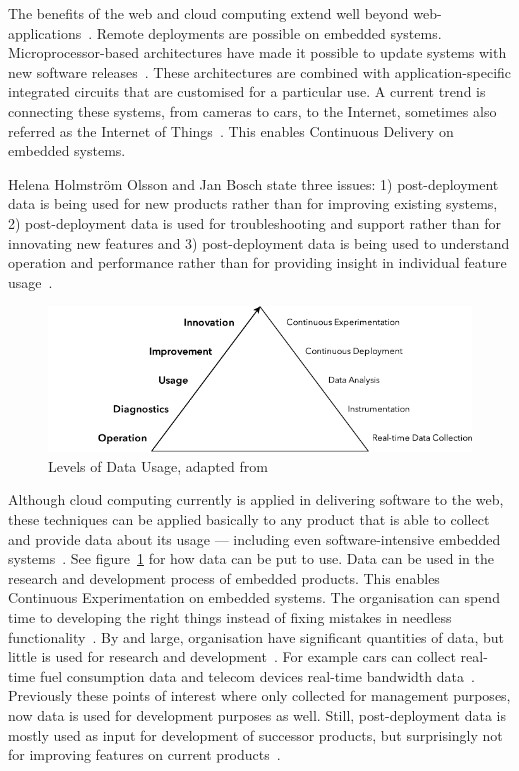 \documentclass[english]{tktltiki2}
\begin{document}
The benefits of the web and cloud computing extend well beyond web-applications~\cite{BE12}. Remote deployments are possible on embedded systems. Microprocessor-based architectures have made it possible to update systems with new software releases~\cite{RA03}. These architectures are combined with application-specific integrated circuits that are customised for a particular use. A current trend is connecting these systems, from cameras to cars, to the Internet, sometimes also referred as the Internet of Things~\cite{BE12, HB14}. This enables Continuous Delivery on embedded systems.

Helena Holmström Olsson and Jan Bosch state three issues: 1) post-deployment data is being used for new products rather than for improving existing systems, 2) post-deployment data is used for troubleshooting and support rather than for innovating new features and 3) post-deployment data is being used to understand operation and performance rather than for providing insight in individual feature usage~\cite{HB14}.

\begin{figure}[h!]

    \vspace{1cm}
    \centering

    \includegraphics{figures/data-usage}

    \caption{Levels of Data Usage, adapted from~\cite{HB14}}
    \label{figure:data-usage}

    \vspace{1cm}

\end{figure}

Although cloud computing currently is applied in delivering software to the web, these techniques can be applied basically to any product that is able to collect and provide data about its usage — including even software-intensive embedded systems~\cite{BE12, Bos12}. See figure~\ref{figure:data-usage} for how data can be put to use. Data can be used in the research and development process of embedded products. This enables Continuous Experimentation on embedded systems. The organisation can spend time to developing the right things instead of fixing mistakes in needless functionality~\cite{HAB12}. By and large, organisation have significant quantities of data, but little is used for research and development~\cite{HB14}. For example cars can collect real-time fuel consumption data and telecom devices real-time bandwidth data~\cite{Bos12}. Previously these points of interest where only collected for management purposes, now data is used for development purposes as well. Still, post-deployment data is mostly used as input for development of successor products, but surprisingly not for improving features on current products~\cite{HB14}.
\end{document}
